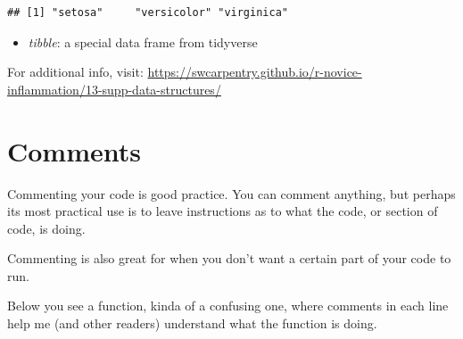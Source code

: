 \documentclass[
]{book}
\newenvironment{Shaded}{\begin{snugshade}}{\end{snugshade}}
\newcommand{\FunctionTok}[1]{\textcolor[rgb]{0.00,0.00,0.00}{#1}}
\newcommand{\NormalTok}[1]{#1}
\newcommand{\SpecialCharTok}[1]{\textcolor[rgb]{0.00,0.00,0.00}{#1}}
\providecommand{\tightlist}{%
  \setlength{\itemsep}{0pt}\setlength{\parskip}{0pt}}
\begin{document}
\begin{Shaded}
\end{Shaded}

\begin{verbatim}
## [1] "setosa"     "versicolor" "virginica"
\end{verbatim}

\begin{itemize}
\tightlist
\item
  \emph{tibble}: a special data frame from tidyverse
\end{itemize}

For additional info, visit: \url{https://swcarpentry.github.io/r-novice-inflammation/13-supp-data-structures/}

\hypertarget{comments}{%
\section{Comments}\label{comments}}

Commenting your code is good practice.
You can comment anything, but perhaps its most practical use is to leave instructions as to what the code, or section of code, is doing.

Commenting is also great for when you don't want a certain part of your code to run.

Below you see a function, kinda of a confusing one, where comments in each line help me (and other readers) understand what the function is doing.
\end{document}
